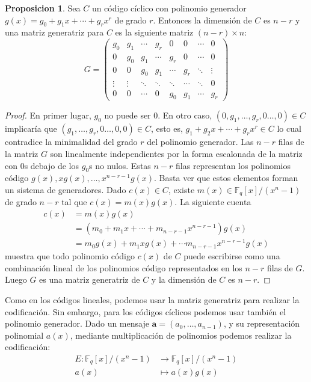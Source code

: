 \documentclass[a4paper,11pt]{article}
\numberwithin{equation}{section}
\theoremstyle{definition} %
\newtheorem{proposicion}{Proposicion}[section]
\renewcommand{\a}{\mathbf{a}}
\newcommand{\Fq}{\mathbb{F}_q}
\newcommand{\Fx}{\Fq[x]/(x^n - 1)}
\begin{document}
    \begin{proposicion}
        Sea $C$ un código cíclico con polinomio generador $g(x) = g_0 + g_1 x + \cdots + g_r x^r$ de grado $r$. Entonces la dimensión de $C$ es $n - r$ y una matriz generatriz para $C$ es la siguiente matriz $(n - r) \times n$:
        $$
        G = \begin{pmatrix}
                g_0 & g_1 & \cdots & g_r & 0 & 0 & \cdots & 0 \\
                0 & g_0 & g_1 & \cdots & g_r & 0 & \cdots & 0 \\
                0 & 0 & g_0 & g_1 & \cdots & g_r & \ddots & \vdots \\
                \vdots & \vdots & \ddots & \ddots & \ddots & \cdots & \ddots & 0  \\
                0 & 0 & \cdots & 0 & g_0 & g_1 & \cdots & g_r
            \end{pmatrix}
        $$
    \end{proposicion}
    \begin{proof}
        En primer lugar, $g_0$ no puede ser 0. En otro caso, $(0, g_1, \ldots, g_r, 0 \ldots, 0) \in C$ implicaría que $(g_1, \ldots, g_r, 0 \ldots, 0, 0 ) \in C$, esto es, $g_1 + g_2 x + \cdots + g_r x^r \in C$ lo cual contradice la minimalidad del grado $r$ del polinomio generador. Las $n - r$ filas de la matriz $G$ son linealmente independientes por la forma escalonada de la matriz con 0s debajo de los $g_0$s no nulos. Estas $n - r$ filas representan los polinomios código $g(x), x g(x), \ldots, x^{n - r - 1}g(x)$. Basta ver que estos elementos forman un sistema de generadores. Dado $c(x) \in C$, existe $m(x) \in \Fx$ de grado $n - r$  tal que $c(x) = m(x) g(x)$. La siguiente cuenta
        \begin{align*}
            c(x) &= m(x) g(x) \\
                 &= (m_0 + m_1 x + \cdots + m_{n - r - 1} x^{n - r - 1}) g(x) \\
                 &= m_0 g(x) + m_1 x g(x) + \cdots m_{n - r - 1} x^{n - r - 1} g(x)
        \end{align*}
        muestra que todo polinomio código $c(x)$ de $C$ puede escribirse como una combinación lineal de los polinomios código representados en los $n - r$ filas de $G$. Luego $G$ es una matriz generatriz de $C$ y la dimensión de $C$ es $n - r$.
    \end{proof}

    Como en los códigos lineales, podemos usar la matriz generatriz para realizar la codificación. Sin embargo, para los códigos cíclicos podemos usar también el polinomio generador. Dado un mensaje $\a = (a_0, \dots, a_{n-1})$, y su representación polinomial $a(x)$, mediante multiplicación de polinomios podemos realizar la codificación:
    \begin{align*}
        E: \Fx &\to \Fx \\
        a(x) &\mapsto a(x)g(x)
    \end{align*}
\end{document}
